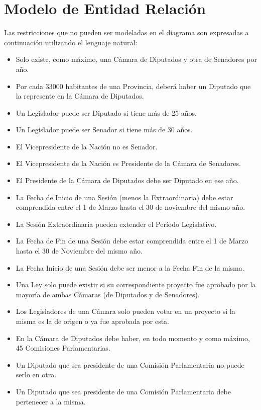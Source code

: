 \section{Modelo de Entidad Relación}


Las restricciones que no pueden ser modeladas en el diagrama son expresadas a continuación utilizando el lenguaje natural:
\begin{itemize}
	\item Solo existe, como máximo, una Cámara de Diputados y otra de Senadores por año. 
	\item Por cada 33000 habitantes de una Provincia, deberá haber un Diputado que la represente en la Cámara de Diputados. 
	\item Un Legislador puede ser Diputado si tiene más de 25 años.
	\item Un Legislador puede ser Senador si tiene más de 30 años.
	\item El Vicepresidente de la Nación no es Senador.
	\item El Vicepresidente de la Nación es Presidente de la Cámara de Senadores. 
	\item El Presidente de la Cámara de Diputados debe ser Diputado en ese año. 
	\item La Fecha de Inicio de una Sesión (menos la Extraordinaria) debe estar comprendida entre el 1 de Marzo hasta el 30 de noviembre del mismo año.	
	\item La Sesión Extraordinaria pueden extender el Período Legislativo. 
	\item La Fecha de Fin de una Sesión debe estar comprendida entre el 1 de Marzo hasta el 30 de Noviembre del mismo año.
	\item La Fecha Inicio de una Sesión debe ser menor a la Fecha Fin de la misma. 
	\item Una Ley solo puede existir si su correspondiente proyecto fue aprobado por la mayoría de ambas Cámaras (de Diputados y de Senadores).
	\item Los Legisladores de una Cámara solo pueden votar en un proyecto si la misma es la de origen o ya fue aprobada por esta.
	\item En la Cámara de Diputados debe haber, en todo momento y como máximo, 45 Comisiones Parlamentarias.
	\item Un Diputado que sea presidente de una Comisión Parlamentaria no puede serlo en otra.   
	\item Un Diputado que sea presidente de una Comisión Parlamentaria debe pertenecer a la misma. 

\end{itemize}
